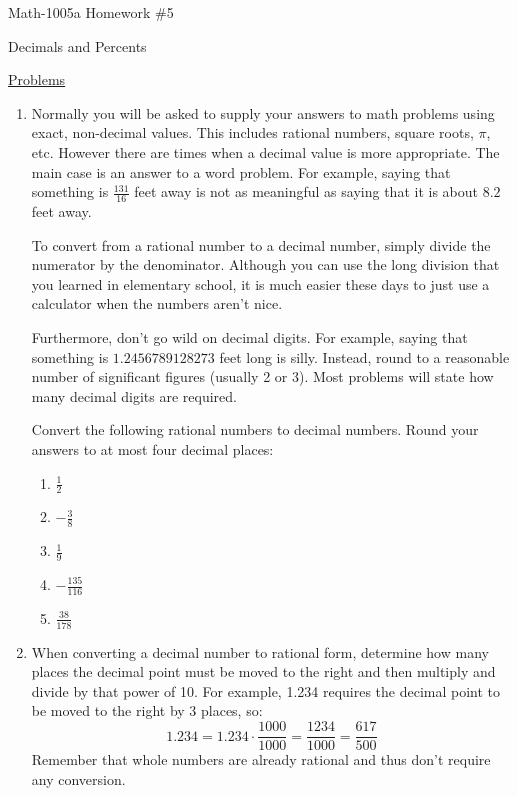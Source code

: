 \documentclass[letterpaper,12pt,fleqn]{article}
\begin{document}
\begin{center}
  \Large Math-1005a Homework \#5
  
  Decimals and Percents
\end{center}

\vspace{0.5in}

\underline{Problems}

\begin{enumerate}
\item Normally you will be asked to supply your answers to math problems
  using exact, non-decimal values. This includes rational numbers, square
  roots, $\pi$, etc. However there are times when a decimal value is more
  appropriate. The main case is an answer to a word problem. For example,
  saying that something is $\frac{131}{16}$ feet away is not as meaningful as
  saying that it is about $8.2$ feet away.

  To convert from a rational number to a decimal number, simply divide the
  numerator by the denominator. Although you can use the long division that you
  learned in elementary school, it is much easier these days to just use a
  calculator when the numbers aren't nice.

  Furthermore, don't go wild on decimal digits. For example, saying that
  something is $1.2456789128273$ feet long is silly. Instead, round to a
  reasonable number of significant figures (usually 2 or 3). Most problems will
  state how many decimal digits are required.

  Convert the following rational numbers to decimal numbers. Round your answers
  to at most four decimal places:
  \begin{enumerate}
  \item $\frac{1}{2}$

  \item $-\frac{3}{8}$

  \item $\frac{1}{9}$
    
  \item $-\frac{135}{116}$

  \item $\frac{38}{178}$
  \end{enumerate}

\item When converting a decimal number to rational form, determine how many
  places the decimal point must be moved to the right and then multiply and
  divide by that power of 10. For example, 1.234 requires the decimal point to
  be moved to the right by 3 places, so: 
  \[1.234=1.234\cdot\frac{1000}{1000}=\frac{1234}{1000}=\frac{617}{500}\]
  Remember that whole numbers are already rational and thus don't require any
  conversion.


\end{enumerate}
\end{document}
